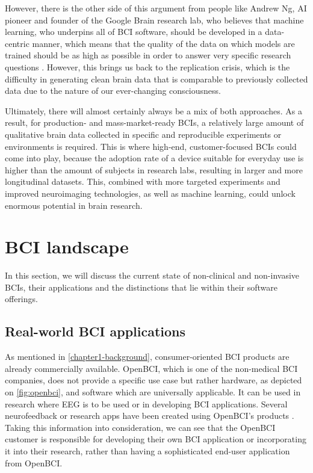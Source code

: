 However, there is the other side of this argument from people like Andrew Ng, AI pioneer and founder of the Google Brain research lab, who believes that machine learning, who underpins all of BCI software, should be developed in a data-centric manner, which means that the quality of the data on which models are trained should be as high as possible in order to answer very specific research questions \citep{brown_why_2022}. However, this brings us back to the replication crisis, which is the difficulty in generating clean brain data that is comparable to previously collected data due to the nature of our ever-changing consciousness. 

Ultimately, there will almost certainly always be a mix of both approaches. As a result, for production- and mass-market-ready BCIs, a relatively large amount of qualitative brain data collected in specific and reproducible experiments or environments is required. This is where high-end, customer-focused BCIs could come into play, because the adoption rate of a device suitable for everyday use is higher than the amount of subjects in research labs, resulting in larger and more longitudinal datasets. This, combined with more targeted experiments and improved neuroimaging technologies, as well as machine learning, could unlock enormous potential in brain research.

\section{BCI landscape}
\label{chapter2-research-landscape}

In this section, we will discuss the current state of non-clinical and non-invasive BCIs, their applications and the distinctions that lie within their software offerings.

\subsection{Real-world BCI applications}
\label{chapter2-real-world-bci-applications}

As mentioned in \autoref{chapter1-background}, consumer-oriented BCI products are already commercially available. OpenBCI, which is one of the non-medical BCI companies, does not provide a specific use case but rather hardware, as depicted on \autoref{fig:openbci}, and software which are universally applicable. It can be used in research where EEG is to be used or in developing BCI applications. Several neurofeedback or research apps have been created using OpenBCI's products \citep{openbci_openbci_nodate}. Taking this information into consideration, we can see that the OpenBCI customer is responsible for developing their own BCI application or incorporating it into their research, rather than having a sophisticated end-user application from OpenBCI.

